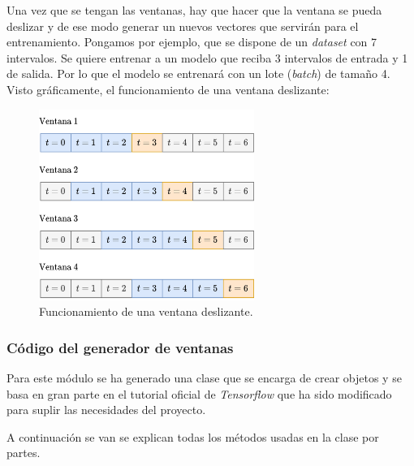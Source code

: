 Una vez que se tengan las ventanas, hay que hacer que la ventana se pueda deslizar y de ese modo generar un nuevos vectores que servirán para el entrenamiento. Pongamos por ejemplo, que se dispone de un \textit{dataset} con 7 intervalos. Se quiere entrenar a un modelo que reciba 3 intervalos de entrada y 1 de salida. Por lo que el modelo se entrenará con un lote (\textit{batch}) de tamaño 4. Visto gráficamente, el funcionamiento de una ventana deslizante:

\begin{figure}[H]
    \centering
    \includegraphics[width=7cm]{images/solution/modules/windows/sliding-windows.png}
    \caption{Funcionamiento de una ventana deslizante.}
\end{figure}


\subsubsection{Código del generador de ventanas}\label{window-generator-code}

Para este módulo se ha generado una clase que se encarga de crear objetos y se basa en gran parte en el tutorial oficial de \textit{Tensorflow} \cite{tensorflow2015-whitepaper} que ha sido modificado para suplir las necesidades del proyecto.
\newline

A continuación se van se explican todas los métodos usadas en la clase por partes.

